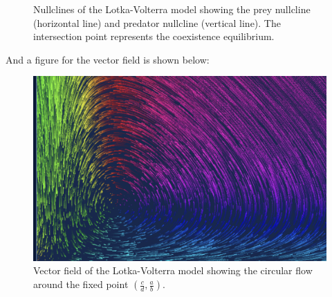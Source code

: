 \documentclass[11pt]{article}
\begin{document}
\begin{example}
\begin{figure}[h!]
            \caption{Nullclines of the Lotka-Volterra model showing the prey nullcline (horizontal line) and predator nullcline (vertical line). The intersection point represents the coexistence equilibrium.}
        \end{figure}
        And a figure for the vector field is shown below:
        \begin{figure}[h!]
            \centering
            \includegraphics[width=0.6\linewidth]{predprey.png}
            \caption{Vector field of the Lotka-Volterra model showing the circular flow around
            the fixed point \(\left(\frac{c}{d}, \frac{a}{b}\right)\).}
        \end{figure}
\end{example}
\end{document}
